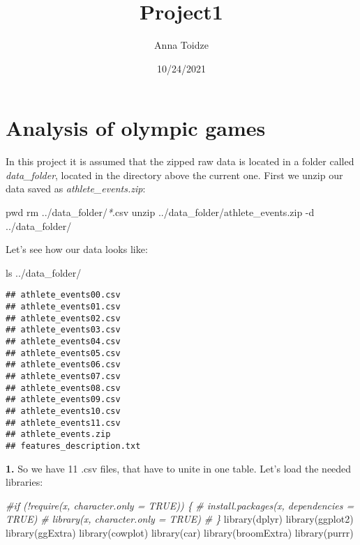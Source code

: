 \documentclass[
]{article}
\title{Project1}
\author{Anna Toidze}
\date{10/24/2021}
\newenvironment{Shaded}{\begin{snugshade}}{\end{snugshade}}
\newcommand{\AttributeTok}[1]{\textcolor[rgb]{0.77,0.63,0.00}{#1}}
\newcommand{\BuiltInTok}[1]{#1}
\newcommand{\CommentTok}[1]{\textcolor[rgb]{0.56,0.35,0.01}{\textit{#1}}}
\newcommand{\FunctionTok}[1]{\textcolor[rgb]{0.00,0.00,0.00}{#1}}
\newcommand{\NormalTok}[1]{#1}
\newcommand{\PreprocessorTok}[1]{\textcolor[rgb]{0.56,0.35,0.01}{\textit{#1}}}
\begin{document}
\maketitle

\hypertarget{analysis-of-olympic-games}{%
\section{Analysis of olympic games}\label{analysis-of-olympic-games}}

In this project it is assumed that the zipped raw data is located in a
folder called \emph{data\_folder}, located in the directory above the
current one. First we unzip our data saved as
\emph{athlete\_events.zip}:

\begin{Shaded}
\begin{Highlighting}[]
\BuiltInTok{pwd}
\FunctionTok{rm}\NormalTok{ ../data\_folder/}\PreprocessorTok{*}\NormalTok{.csv}
\FunctionTok{unzip}\NormalTok{ ../data\_folder/athlete\_events.zip }\AttributeTok{{-}d}\NormalTok{ ../data\_folder/}
\end{Highlighting}
\end{Shaded}

Let's see how our data looks like:

\begin{Shaded}
\begin{Highlighting}[]
\FunctionTok{ls}\NormalTok{ ../data\_folder/}
\end{Highlighting}
\end{Shaded}

\begin{verbatim}
## athlete_events00.csv
## athlete_events01.csv
## athlete_events02.csv
## athlete_events03.csv
## athlete_events04.csv
## athlete_events05.csv
## athlete_events06.csv
## athlete_events07.csv
## athlete_events08.csv
## athlete_events09.csv
## athlete_events10.csv
## athlete_events11.csv
## athlete_events.zip
## features_description.txt
\end{verbatim}

\textbf{1.} So we have 11 .csv files, that have to unite in one table.
Let's load the needed libraries:

\begin{Shaded}
\begin{Highlighting}[]
\CommentTok{\#if (!require(x, character.only = TRUE)) \{}
\CommentTok{\#      install.packages(x, dependencies = TRUE)}
\CommentTok{\#      library(x, character.only = TRUE)}
\CommentTok{\#    \}}
\FunctionTok{library}\NormalTok{(dplyr)}
\FunctionTok{library}\NormalTok{(ggplot2)}
\FunctionTok{library}\NormalTok{(ggExtra)}
\FunctionTok{library}\NormalTok{(cowplot)}
\FunctionTok{library}\NormalTok{(car)}
\FunctionTok{library}\NormalTok{(broomExtra)}
\FunctionTok{library}\NormalTok{(purrr)}
\end{Highlighting}
\end{Shaded}
\end{document}
